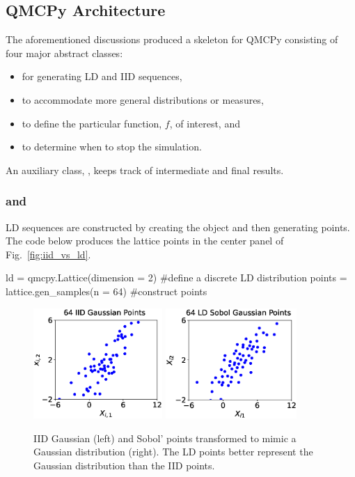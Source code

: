 \documentclass[11pt]{NSFamsart}
\begin{document}
\subsection{QMCPy Architecture}

The aforementioned discussions produced a skeleton for QMCPy consisting of four major abstract classes:
\begin{itemize}
	\item {} for generating LD and IID sequences,
	\item {} to accommodate more general distributions or measures,
	\item {} to define the particular function, $f$, of interest, and
	\item {} to determine when to stop the simulation.
\end{itemize}
An auxiliary class, , keeps track of intermediate and final results.

\subsubsection{\textup{ and }} LD sequences are constructed by creating the object and then generating points.  The code below produces the lattice points in the center panel of Fig.\ \ref{fig:iid_vs_ld}.
\begin{pythoncode}
ld = qmcpy.Lattice(dimension = 2)  #define a discrete LD distribution
points = lattice.gen_samples(n = 64)  #construct points
\end{pythoncode}

\begin{figure}
	\centering
	\includegraphics[height = 4.2cm]{ProgramsImages/Gauss_IID.eps}
	\includegraphics[height = 4.2cm]{ProgramsImages/Gauss_Sobol.eps}
	\caption{IID Gaussian (left) and Sobol'  points transformed to mimic a Gaussian distribution (right).  The LD points better represent the Gaussian distribution than the IID points. \label{fig:ld_Gauss}}
\end{figure}
\end{document}
